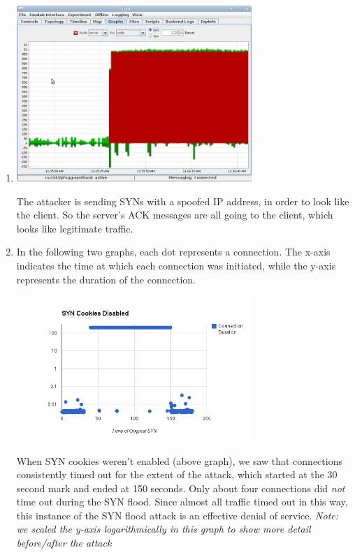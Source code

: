\documentclass[11pt]{article}
\begin{document}
\begin{enumerate}
\begin{center}
  \end{center}
\item \text{}
  \begin{center}
    \includegraphics[width=3.5in]{red-traffic.png}
  \end{center}
  The attacker is sending SYNs with a spoofed IP address, in order to look like the client. So the server's ACK messages are all going to the client, which looks like legitimate traffic.
\newpage
\item \text{}
  In the following two graphs, each dot represents a connection.  The x-axis indicates the time at which each connection was initiated, while the y-axis represents the duration of the connection.
  \begin{center}
    \includegraphics[width=3.5in]{without-cookies.png} \\
  \end{center}
  When SYN cookies weren't enabled (above graph), we saw that connections consistently timed out for the extent of the attack, which started at the 30 second mark and ended at 150 seconds.  Only about four connections did \emph{not} time out during the SYN flood.  Since almost all traffic timed out in this way, this instance of the SYN flood attack is an effective denial of service.  \emph{Note: we scaled the y-axis logarithmically in this graph to show more detail before/after the attack}

\end{enumerate}
\end{document}
